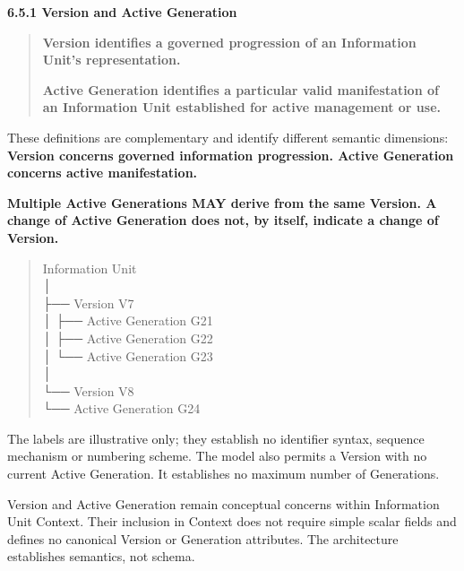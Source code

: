 \par\medskip\textbf{6.5.1 Version and Active Generation}\par


\begin{quote}


\textbf{Version identifies a governed progression of an Information Unit's representation.}



\textbf{Active Generation identifies a particular valid manifestation of an Information Unit established for active management or use.}



\end{quote}


These definitions are complementary and identify different semantic dimensions:
\textbf{Version concerns governed information progression. Active Generation concerns
active manifestation.}



\textbf{Multiple Active Generations MAY derive from the same Version. A change of
Active Generation does not, by itself, indicate a change of Version.}



\begin{quote}\small\ttfamily
Information Unit\\
      │\\
      ├── Version V7\\
      │      ├── Active Generation G21\\
      │      ├── Active Generation G22\\
      │      └── Active Generation G23\\
      │\\
      └── Version V8\\
             └── Active Generation G24\\

\end{quote}


The labels are illustrative only; they establish no identifier syntax, sequence
mechanism or numbering scheme. The model also permits a Version with no current
Active Generation. It establishes no maximum number of Generations.



Version and Active Generation remain conceptual concerns within Information Unit
Context. Their inclusion in Context does not require simple scalar fields and
defines no canonical Version or Generation attributes. The architecture
establishes semantics, not schema.



